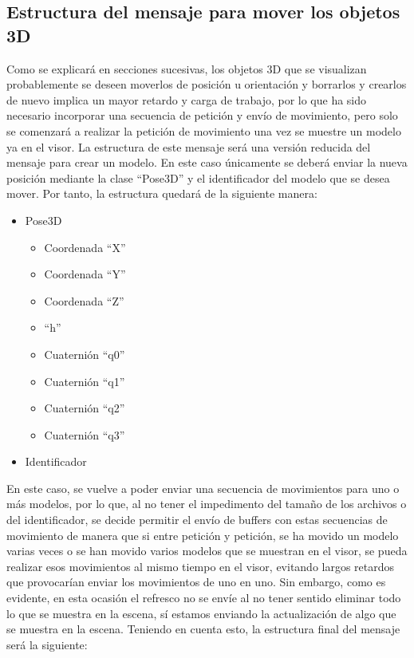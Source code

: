 \subsection{Estructura del mensaje para mover los objetos 3D}
Como se explicará en secciones sucesivas, los objetos 3D que se visualizan probablemente se deseen moverlos de posición u orientación y borrarlos y crearlos de nuevo implica un mayor retardo y carga de trabajo, por lo que ha sido necesario incorporar una secuencia de petición y envío de movimiento, pero solo se comenzará a realizar la petición de movimiento una vez se muestre un modelo ya en el visor. La estructura de este mensaje será una versión reducida del mensaje para crear un modelo. En este caso únicamente se deberá enviar la nueva posición mediante la clase ``Pose3D'' y el identificador del modelo que se desea mover. Por tanto, la estructura quedará de la siguiente manera:
\begin{itemize}
	\item	Pose3D
	\begin{itemize}
		\item Coordenada ``X''
		\item Coordenada ``Y''
		\item Coordenada ``Z''
		\item ``h''
		\item Cuaternión ``q0''
		\item Cuaternión ``q1''
		\item Cuaternión ``q2''
		\item Cuaternión ``q3''
	\end{itemize}
	\item Identificador
\end{itemize}
En este caso, se vuelve a poder enviar una secuencia de movimientos para uno o más modelos, por lo que, al no tener el impedimento del tamaño de los archivos o del identificador, se decide permitir el envío de buffers con estas secuencias de movimiento de manera que si entre petición y petición, se ha movido un modelo varias veces o se han movido varios modelos que se muestran en el visor, se pueda realizar esos movimientos al mismo tiempo en el visor, evitando largos retardos que provocarían enviar los movimientos de uno en uno. Sin embargo, como es evidente, en esta ocasión el refresco no se envíe al no tener sentido eliminar todo lo que se muestra en la escena, sí estamos enviando la actualización de algo que se muestra en la escena. Teniendo en cuenta esto, la estructura final del mensaje será la siguiente:
